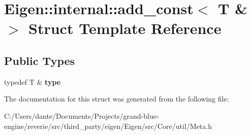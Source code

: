 \hypertarget{struct_eigen_1_1internal_1_1add__const_3_01_t_01_6_01_4}{}\section{Eigen\+::internal\+::add\+\_\+const$<$ T \& $>$ Struct Template Reference}
\label{struct_eigen_1_1internal_1_1add__const_3_01_t_01_6_01_4}
\subsection*{Public Types}
\begin{DoxyCompactItemize}
\item 
\mbox{\label{struct_eigen_1_1internal_1_1add__const_3_01_t_01_6_01_4_aaf6bf259eadbe000056c6b33d1ef7d0b}} 
typedef T \& {\bfseries type}
\end{DoxyCompactItemize}


The documentation for this struct was generated from the following file\+:\begin{DoxyCompactItemize}
\item 
C\+:/\+Users/dante/\+Documents/\+Projects/grand-\/blue-\/engine/reverie/src/third\+\_\+party/eigen/\+Eigen/src/\+Core/util/Meta.\+h\end{DoxyCompactItemize}
